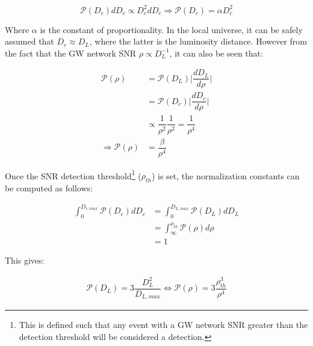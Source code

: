         \begin{equation}
            \mathcal{P}(D_c) dD_c \propto D_c^2 dD_c \Rightarrow
                \boxed{\mathcal{P}(D_c) = \alpha D_c^2}
        \end{equation}

        Where $\alpha$ is the constant of proportionality. In the local universe, it can
        be safely assumed that $D_c \approx D_L$, where the latter is the luminosity
        distance.  However from the fact that the GW network SNR $\rho \propto
        D_L^{-1}$, it can also be seen that:

        \begin{align}
            \mathcal{P}(\rho) &= \mathcal{P}(D_L)
                                  \Big \lvert \dfrac{dD_L}{d\rho} \Big \rvert
                                  \nonumber\\
                              &= \mathcal{P}({D_c})
                                  \Big \lvert \dfrac{dD_c}{d\rho} \Big \rvert
                                  \nonumber\\
                              &\propto \dfrac{1}{\rho^2} \dfrac{1}{\rho^2}
                                  = \dfrac{1}{\rho^4} \nonumber\\
            \Rightarrow \mathcal{P} (\rho) &= \dfrac{\beta}{\rho^4}
        \end{align}

        Once the SNR detection threshold\footnote{
            This is defined such that any event with a GW network SNR greater than the
            detection threshold will be considered a detection.
        } ($\rho_{th}$) is set, the normalization constants can be computed as follows:

        \begin{align}
            \int_0^{D_{c, max}}
                \mathcal{P}(D_c) dD_c &= \int_0^{D_{L, max}} \mathcal{P}(D_L) dD_L \\
                                      &= \int_\infty^{\rho_{th}} \mathcal{P}(\rho)
                                          d\rho \\
                                      &= 1
        \end{align}

        This gives:

        \begin{align}
            \label{eq:lum_dist}
            \mathcal{P}(D_L) = 3 \dfrac{D_L^2}{D_{L, max}}
                                 \Leftrightarrow
            \mathcal{P}(\rho) = 3 \dfrac{\rho_{th}^3}{\rho^4}
        \end{align}

